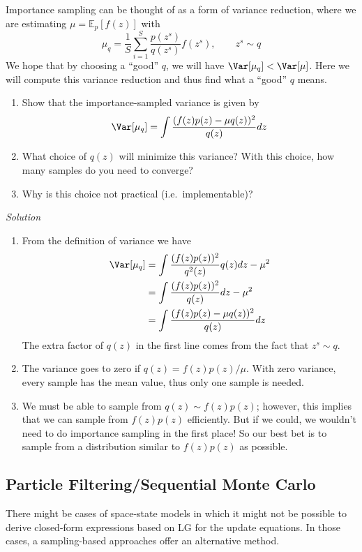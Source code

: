 \documentclass{article}
\begin{document}
\begin{exercise}
Importance sampling can be thought of as a form of variance reduction, where we are estimating $\mu = \mathbb{E}_p[f(z)]$ with
\[ \mu_q = \frac{1}{S} \sum_{i=1}^S\frac{p(z^s)}{q(z^s)}f(z^s), \qquad z^s \sim q \]
We hope that by choosing a ``good'' $q$, we will have $\Var[\mu_q] < \Var[\mu]$.  Here we will compute this variance reduction and thus find what a ``good'' $q$ means.
\begin{enumerate}
\item Show that the importance-sampled variance is given by
\[ \Var[\mu_q] = \int \frac{(f(z)p(z) - \mu q(z))^2}{q(z)} dz \]
\item What choice of $q(z)$ will minimize this variance?  With this choice, how many samples do you need to converge?
\item Why is this choice not practical (i.e.~implementable)?
\end{enumerate}

\textit{Solution}
\begin{enumerate}
\item From the definition of variance we have
\begin{align*}
\Var[\mu_q] &= \int \frac{(f(z)p(z))^2}{q^2(z)} q(z)dz - \mu^2 \\
			&= \int \frac{(f(z)p(z))^2}{q(z)} dz - \mu^2 \\
			&= \int \frac{(f(z)p(z) - \mu q(z))^2}{q(z)} dz \\
\end{align*}
The extra factor of $q(z)$ in the first line comes from the fact that $z^s \sim q$.

\item The variance goes to zero if $q(z) = f(z)p(z)/\mu$.  With zero variance, every sample has the mean value, thus only one sample is needed.
\item We must be able to sample from $q(z) \sim f(z)p(z)$; however, this implies that we can sample from $f(z)p(z)$ efficiently.  But if we could, we wouldn't need to do importance sampling in the first place! So our best bet is to sample from a distribution similar to $f(z)p(z)$ as possible.
\end{enumerate}

\end{exercise}


\subsection{Particle Filtering/Sequential Monte Carlo}
There might be cases of space-state models in which it might not be possible to derive closed-form expressions based on LG for the update equations. In those cases, a sampling-based approaches offer an alternative method. 
\end{document}

